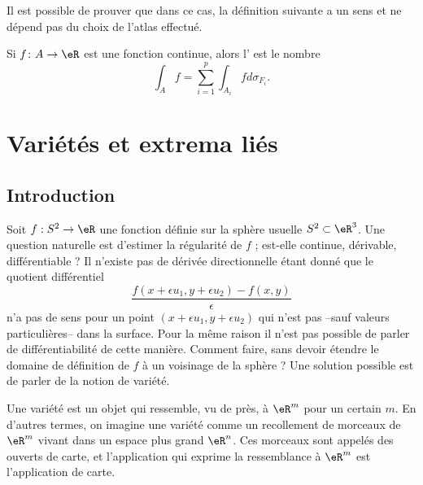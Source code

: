 Il est possible de prouver que dans ce cas, la définition suivante a un sens et ne dépend pas du choix de l'atlas effectué.
\begin{definition}
	Si $f\colon A\to \eR$ est une fonction continue, alors l' est le nombre
	\begin{equation}
		\int_Af=\sum_{i=1}^p\int_{A_i}fd\sigma_{F_i}.
	\end{equation}
\end{definition}

\section{Variétés et extrema liés}

\subsection{Introduction}
Soit $f : S^2 \to \eR$ une fonction définie sur la sphère usuelle
$S^2 \subset \eR^3$. Une question naturelle est d'estimer la
régularité de $f$ ; est-elle continue, dérivable, différentiable ? Il
n'existe pas de dérivée directionnelle étant donné que le quotient
différentiel
\begin{equation*}
  \frac{f(x + \epsilon u_1 ,y + \epsilon u_2) - f(x,y)}{\epsilon}
\end{equation*}
n'a pas de sens pour un point $(x + \epsilon u_1 ,y + \epsilon u_2)$
qui n'est pas --sauf valeurs particulières-- dans la surface. Pour la
même raison il n'est pas possible de parler de différentiabilité de
cette manière. Comment faire, sans devoir étendre le domaine de
définition de $f$ à un voisinage de la sphère ? Une solution possible
est de parler de la notion de variété.

Une variété est un objet qui ressemble, vu de près, à $\eR^m$ pour un
certain $m$. En d'autres termes, on imagine une variété comme un
recollement de morceaux de $\eR^m$ vivant dans un espace plus grand
$\eR^n$. Ces morceaux sont appelés des ouverts de carte, et
l'application qui exprime la ressemblance à $\eR^m$ est l'application
de carte.

